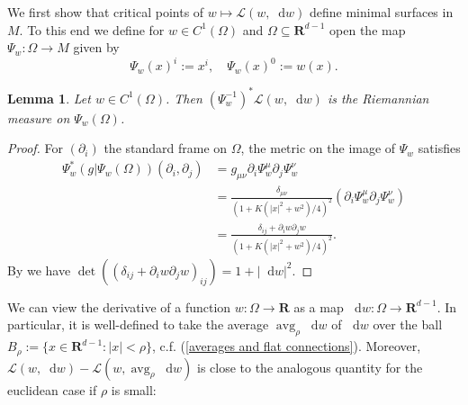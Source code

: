 \documentclass[reqno,10pt]{amsart}
\newcommand{\RR}{\mathbf{R}}
\DeclareMathOperator{\avg}{avg}
\newcommand*\dif{\mathop{}\!\mathrm{d}}
\newcommand{\Lagrange}{\mathscr L}
\newtheorem{lemma}[theorem]{Lemma}
\theoremstyle{definition}
\numberwithin{equation}{section}
\begin{document}
We first show that critical points of $w \mapsto \Lagrange(w, \dif w)$ define minimal surfaces in $M$.
To this end we define for $w \in C^1(\Omega)$ and $\Omega \subseteq \RR^{d - 1}$ open the map $\Psi_w: \Omega \to M$ given by
$$\Psi_w(x)^i := x^i, \quad \Psi_w(x)^0 := w(x).$$

\begin{lemma}\label{Plateau setup lemma}
Let $w \in C^1(\Omega)$. Then $(\Psi_w^{-1})^* \Lagrange(w, \dif w)$ is the Riemannian measure on $\Psi_w(\Omega)$.
\end{lemma}
\begin{proof}
For $(\partial_i)$ the standard frame on $\Omega$, the metric on the image of $\Psi_w$ satisfies
\begin{align*}
\Psi_w^*(g|\Psi_w(\Omega))(\partial_i, \partial_j) &= g_{\mu\nu} \partial_i \Psi_w^\mu \partial_j \Psi_w^\nu \\
&= \frac{\delta_{\mu\nu}}{(1 + K(|x|^2 + w^2)/4)^2} (\partial_i \Psi_w^\mu \partial_j \Psi_w^\nu) \\
&= \frac{\delta_{ij} + \partial_i w \partial_j w}{(1 + K(|x|^2 + w^2)/4)^2}.
\end{align*}
By \cite[(24)]{Petersen2008} we have $\det((\delta_{ij} + \partial_i w \partial_j w)_{ij}) = 1 + |\dif w|^2$.
\end{proof}

We can view the derivative of a function $w: \Omega \to \RR$ as a map $\dif w: \Omega \to \RR^{d - 1}$.
In particular, it is well-defined to take the average $\avg_\rho \dif w$ of $\dif w$ over the ball $B_\rho := \{x \in \RR^{d - 1}: |x| < \rho\}$, c.f. (\ref{averages and flat connections}).
Moreover, $\Lagrange(w, \dif w) - \Lagrange(w, \avg_\rho \dif w)$ is close to the analogous quantity for the euclidean case if $\rho$ is small:
\end{document}
